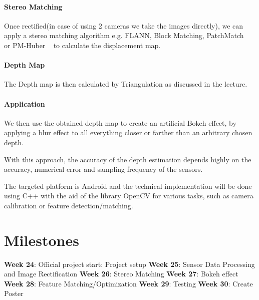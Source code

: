 \documentclass[a4paper,pagesize 10pt]{scrartcl}
\begin{document}
\paragraph{Stereo Matching}
Once rectified(in case of using 2 cameras we take the images directly), we can apply a stereo matching algorithm e.g. FLANN, Block Matching, PatchMatch ~\cite{Bleyer2011} or PM-Huber ~\cite{Heise2013} to calculate the displacement map. 
\paragraph{Depth Map}
The Depth map is then calculated by Triangulation as discussed in the lecture.
\paragraph{Application}
We then use the obtained depth map to create an artificial Bokeh effect, by applying a blur effect to all everything closer or farther than an arbitrary chosen depth.


With this approach, the accuracy of the depth estimation depends highly on the accuracy, numerical error and sampling frequency of the sensors.

The targeted platform is Android and the technical implementation will be done using C++ with the aid of the library OpenCV for various tasks, such as camera calibration or feature detection/matching.

%
%
\section{Milestones}
\textbf{Week 24}: Official project start: Project setup\newline
\textbf{Week 25}: Sensor Data Processing and Image Rectification\newline
\textbf{Week 26}: Stereo Matching\newline
\textbf{Week 27}: Bokeh effect\newline
\textbf{Week 28}: Feature Matching/Optimization \newline
\textbf{Week 29}: Testing\newline
\textbf{Week 30}: Create Poster\newline
\end{document}
